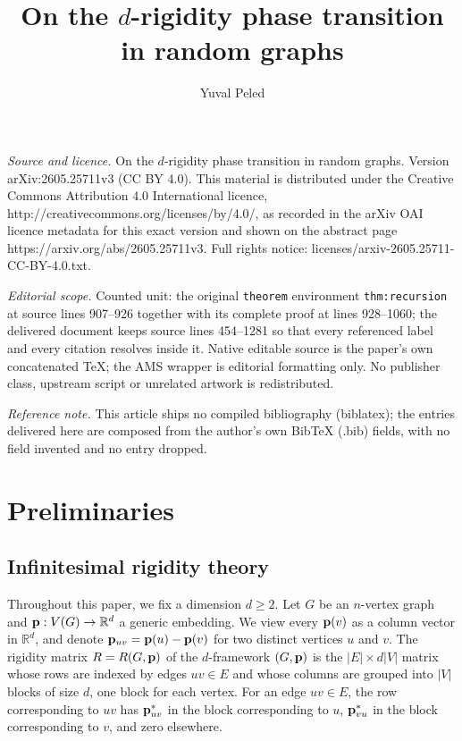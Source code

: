 \documentclass[10pt,a4paper]{amsart}
\numberwithin{equation}{section}
\newcommand{\R}{\mathbb R}
\newcommand{\p}{{\bf p}}
\begin{document}
\title[On the d-rigidity phase transition in random graphs]{On the $d$-rigidity phase transition in random graphs}
\author{Yuval Peled}
\date{}
\maketitle
\noindent\emph{Source and licence.} On the $d$-rigidity phase transition in random graphs. Version arXiv:2605.25711v3 (CC BY 4.0). This material is distributed under the Creative Commons Attribution 4.0 International licence, http://creativecommons.org/licenses/by/4.0/, as recorded in the arXiv OAI licence metadata for this exact version and shown on the abstract page https://arxiv.org/abs/2605.25711v3. Full rights notice: licenses/arxiv-2605.25711-CC-BY-4.0.txt.\par\smallskip
\noindent\textit{Editorial scope.} Counted unit: the original \texttt{theorem} environment \texttt{thm:recursion} at source lines 907--926 together with its complete proof at lines 928--1060; the delivered document keeps source lines 454--1281 so that every referenced label and every citation resolves inside it. Native editable source is the paper's own concatenated TeX; the AMS wrapper is editorial formatting only. No publisher class, upstream script or unrelated artwork is redistributed.
\par\smallskip\noindent\textit{Reference note.} This article ships no compiled bibliography (biblatex); the entries delivered here are composed from the author's own BibTeX (.bib) fields, with no field invented and no entry dropped.
\section{Preliminaries}\label{sec:preliminaries}
\subsection{Infinitesimal rigidity theory}
Throughout this paper, we fix a dimension $d\ge 2$. Let $G$ be an $n$-vertex graph and $\p:V(G)\to\R^d$ a generic embedding. We view every $\p(v)$ as a column vector in $\R^d$, 
and denote $\p_{uv}=\p(u)-\p(v)$ for two distinct vertices $u$ and $v$. 
The rigidity matrix $R = R(G,\p)$ of the $d$-framework $(G,\p)$ is the $|E| \times d|V|$ matrix whose rows are indexed by edges $uv \in E$ and whose columns are grouped into $|V|$ blocks of size $d$, one block for each vertex. 
For an edge $uv \in E$, the row corresponding to $uv$ has $\p_{uv}^*$ in the block corresponding to $u$, $\p_{vu}^*$ in the block corresponding to $v$, and zero elsewhere.
\end{document}
